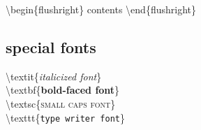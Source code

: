 \documentclass{article}
\begin{document}
        \begin{flushright}         
        \textbackslash begin\{flushright\} contents \textbackslash end\{flushright\}   
        \end{flushright}
        
    \subsection{special fonts}
        \textbackslash textit\{\textit{italicized font}\}\\
        \textbackslash textbf\{\textbf{bold-faced font}\}\\
        \textbackslash textsc\{\textsc{small caps font}\}\\
        \textbackslash texttt\{\texttt{type writer font}\}
        
 
        
    
        


        
\end{document}

